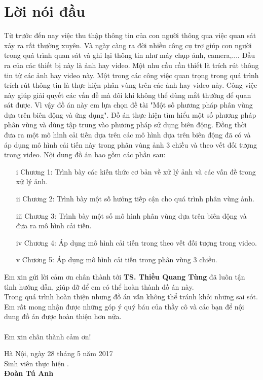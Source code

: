 \documentclass[12pt, oneside, a4]{book}
\begin{document}
%
\chapter*{Lời nói đầu}
Từ trước đến nay việc thu thập thông tin của con người thông qua việc quan sát xảy ra rất thường xuyên. Và ngày càng ra đời nhiều công cụ trợ giúp con người trong quá trình quan sát và ghi lại thông tin như máy chụp ảnh, camera,.... Đầu ra của các thiết bị này là ảnh hay video. Một nhu cầu cần thiết là trích rút thông tin từ các ảnh hay video này. Một trong các công việc quan trọng trong quá trình trích rút thông tin là thực hiện phân vùng trên các ảnh hay video này. Công việc này giúp giải quyết các vấn đề mà đôi khi không thể dùng mắt thường để quan sát được. Vì vậy đồ án này em lựa chọn đề tài "Một số phương pháp phân vùng dựa trên biên động và ứng dụng".  Đồ án thực hiện tìm hiểu một số phương pháp phân vùng và dùng tập trung vào phương pháp sử dụng biên động. Đồng thời đưa ra một mô hình cải tiến dựa trên các mô hình dựa trên biên động đã có và áp dụng mô hình cải tiến này trong phân vùng ảnh 3 chiều và  theo vết đối tượng trong video. Nội dung đồ án bao gồm  các phần sau:
\begin{itemize}
\item[i] Chương 1: Trình bày các kiến thức cơ bản về xử lý ảnh và các vấn đề trong xử lý ảnh.
\item[ii] Chương 2: Trình bày một số hướng tiếp cận cho quá trình phân vùng ảnh.
\item[iii] Chương 3: Trình bày một số mô hình phân vùng dựa trên biên động và đưa ra mô hình cải tiến.
\item[iv] Chương 4: Áp dụng mô hình cải tiến trong theo vết đối tượng trong video.
\item[v] Chương 5: Áp dụng mô hình cải tiến trong phân vùng 3 chiều.
\end{itemize}
 Em xin gửi lời cảm ơn chân thành  tới {\bf TS. Thiều Quang Tùng} đã luôn tận tình hướng dẫn, giúp đỡ để em có thể hoàn thành đồ án này.\\
Trong quá trình hoàn thiện nhưng đồ án vẫn không thể tránh khỏi những sai sót. Em rất mong nhận được những góp ý quý báu của thầy cô và các bạn để nội dung đồ án được hoàn thiện hơn nữa.\\\\
Em xin chân thành cảm ơn!\\


\begin{flushright}
Hà Nội, ngày 28 tháng 5 năm 2017\\[0.5cm]
{Sinh viên thực hiện \hspace*{1.4cm}.}\\[0.1cm]
\textbf{Đoàn Tú Anh\hspace*{2.0cm}}
\end{flushright}
\tableofcontents
\newpage
\listoffigures
\newpage
\newpage
\end{document}
